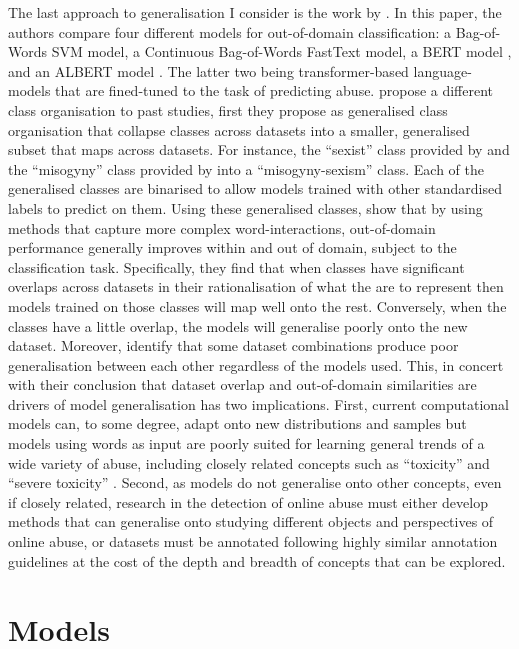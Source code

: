 The last approach to generalisation I consider is the work by \citet{Fortuna:2021}. In this paper, the authors compare four different models for out-of-domain classification: a Bag-of-Words SVM model, a Continuous Bag-of-Words FastText model, a BERT model \citep{Devlin:2019}, and an ALBERT model \cite{Lan:2020}. The latter two being transformer-based language-models that are fined-tuned to the task of predicting abuse.
\citet{Fortuna:2021} propose a different class organisation to past studies, first they propose as generalised class organisation that collapse classes across datasets into a smaller, generalised subset that maps across datasets. For instance, the ``sexist'' class provided by \citet{Waseem-Hovy:2016} and the ``misogyny'' class provided by \citet{Fersini:2018} into a ``misogyny-sexism'' class. Each of the generalised classes are binarised to allow models trained with other standardised labels to predict on them.
Using these generalised classes, \citet{Fortuna:2021} show that by using methods that capture more complex word-interactions, out-of-domain performance generally improves within and out of domain, subject to the classification task.
Specifically, they find that when classes have significant overlaps across datasets in their rationalisation of what the are to represent then models trained on those classes will map well onto the rest.
Conversely, when the classes have a little overlap, the models will generalise poorly onto the new dataset.
Moreover, \citet{Fortuna:2021} identify that some dataset combinations produce poor generalisation between each other regardless of the models used.
This, in concert with their conclusion that dataset overlap and out-of-domain similarities are drivers of model generalisation has two implications.
First, current computational models can, to some degree, adapt onto new distributions and samples but models using words as input are poorly suited for learning general trends of a wide variety of abuse, including closely related concepts such as ``toxicity'' and ``severe toxicity'' \citep{Fortuna:2021}.
Second, as models do not generalise onto other concepts, even if closely related, research in the detection of online abuse must either develop methods that can generalise onto studying different objects and perspectives of online abuse, or datasets must be annotated following highly similar annotation guidelines at the cost of the depth and breadth of concepts that can be explored.

\section{Models}\label{sec:model_background}

